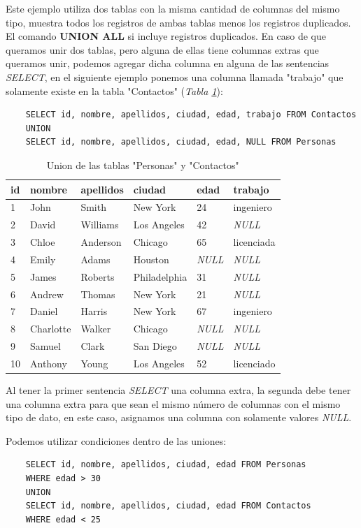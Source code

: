 Este ejemplo utiliza dos tablas con la misma cantidad de columnas del mismo tipo, muestra todos los registros de ambas tablas menos los registros duplicados. El comando \textbf{UNION ALL} si incluye registros duplicados. En caso de que queramos unir dos tablas, pero alguna de ellas tiene columnas extras que queramos unir, podemos agregar dicha columna en alguna de las sentencias \textit{SELECT}, en el siguiente ejemplo ponemos una columna llamada "trabajo" que solamente existe en la tabla "Contactos" (\textit{Tabla \ref{tab: 36}}):
\begin{lstlisting}
    SELECT id, nombre, apellidos, ciudad, edad, trabajo FROM Contactos
    UNION
    SELECT id, nombre, apellidos, ciudad, edad, NULL FROM Personas
\end{lstlisting}
\begin{table}[H]
    \centering
    \caption{Union de las tablas "Personas" y "Contactos"}
    \label{tab: 36}
    \begin{tabular}{|l|l|l|l|l|l|}
        \hline
        \textbf{id} & \textbf{nombre} & \textbf{apellidos} & \textbf{ciudad} & \textbf{edad} & \textbf{trabajo} \\
        \hline
        1 & John        & Smith     & New York      & 24            & ingeniero \\
        \hline
        2 & David       & Williams  & Los Angeles   & 42            & \textit{NULL} \\
        \hline
        3 & Chloe       & Anderson  & Chicago       & 65            & licenciada \\
        \hline
        4 & Emily       & Adams     & Houston       & \textit{NULL} & \textit{NULL} \\
        \hline
        5 & James       & Roberts   & Philadelphia  & 31            & \textit{NULL} \\
        \hline
        6 & Andrew      & Thomas    & New York      & 21            & \textit{NULL} \\
        \hline
        7 & Daniel      & Harris    & New York      & 67            & ingeniero \\
        \hline
        8 & Charlotte   & Walker    & Chicago       & \textit{NULL} & \textit{NULL} \\
        \hline
        9 & Samuel      & Clark     & San Diego     & \textit{NULL} & \textit{NULL} \\
        \hline
        10 & Anthony    & Young     & Los Angeles   & 52            & licenciado \\
        \hline
    \end{tabular}
\end{table}

Al tener la primer sentencia \textit{SELECT} una columna extra, la segunda debe tener una columna extra para que sean el mismo número de columnas con el mismo tipo de dato, en este caso, asignamos una columna con solamente valores \textit{NULL}.

Podemos utilizar condiciones dentro de las uniones:
\begin{lstlisting}
    SELECT id, nombre, apellidos, ciudad, edad FROM Personas
    WHERE edad > 30
    UNION
    SELECT id, nombre, apellidos, ciudad, edad FROM Contactos
    WHERE edad < 25
\end{lstlisting}
